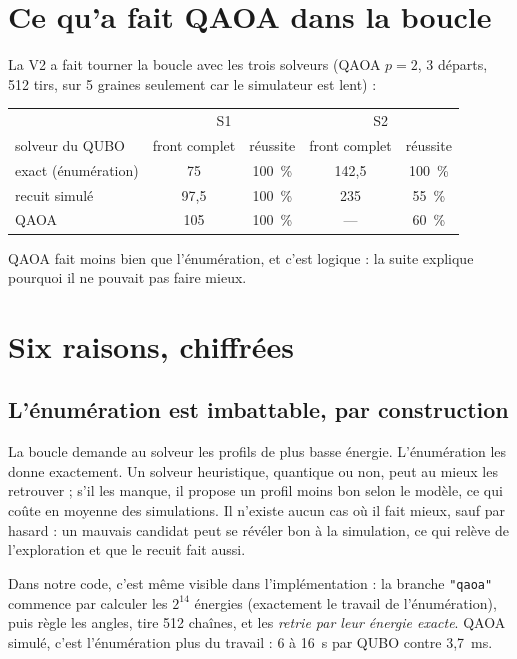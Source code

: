\section{Ce qu'a fait QAOA dans la boucle}
La V2 a fait tourner la boucle avec les trois solveurs (QAOA $p=2$, 3 départs, 512 tirs, sur 5 graines seulement car le simulateur est lent) :
\begin{center}
\renewcommand{\arraystretch}{1.2}
\begin{tabular}{lcccc}
\toprule
 & \multicolumn{2}{c}{S1} & \multicolumn{2}{c}{S2} \\
solveur du QUBO & front complet & réussite & front complet & réussite \\
\midrule
exact (énumération) & 75 & 100~\% & 142,5 & 100~\% \\
recuit simulé & 97,5 & 100~\% & 235 & 55~\% \\
QAOA & 105 & 100~\% & --- & 60~\% \\
\bottomrule
\end{tabular}
\end{center}
QAOA fait moins bien que l'énumération, et c'est logique : la suite explique pourquoi il ne pouvait pas faire mieux.

\section{Six raisons, chiffrées}

\subsection{L'énumération est imbattable, par construction}
La boucle demande au solveur les profils de plus basse énergie. L'énumération les donne exactement. Un solveur heuristique, quantique ou non, peut au mieux les retrouver ; s'il les manque, il propose un profil moins bon selon le modèle, ce qui coûte en moyenne des simulations. Il n'existe aucun cas où il fait mieux, sauf par hasard : un mauvais candidat peut se révéler bon à la simulation, ce qui relève de l'exploration et que le recuit fait aussi.

Dans notre code, c'est même visible dans l'implémentation : la branche \texttt{"qaoa"} commence par calculer les $2^{14}$ énergies (exactement le travail de l'énumération), puis règle les angles, tire 512 chaînes, et les \emph{retrie par leur énergie exacte}. QAOA simulé, c'est l'énumération plus du travail : 6 à 16~s par QUBO contre 3,7~ms.

